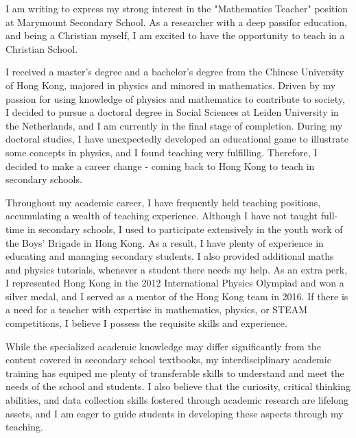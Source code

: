 \documentclass[11pt, a4paper]{awesome-cv}
\begin{document}
\makecvheader[R]

\makecvfooter
  {}%
  {}%
  {}

\makelettertitle

\begin{cvletter}

I am writing to express my strong interest in the "Mathematics Teacher" position at Marymount Secondary School. As a researcher with a deep passifor education, and being a Christian myself, I am excited to have the opportunity to teach in a Christian School.

I received a master's degree and a bachelor's degree from the Chinese University of Hong Kong, majored in physics and minored in mathematics. Driven by my passion for using knowledge of physics and mathematics to contribute to society, I decided to pursue a doctoral degree in Social Sciences at Leiden University in the Netherlands, and I am currently in the final stage of completion. During my doctoral studies, I have unexpectedly developed an educational game to illustrate some concepts in physics, and I found teaching very fulfilling. Therefore, I decided to make a career change - coming back to Hong Kong to teach in secondary schools.

Throughout my academic career, I have frequently held teaching positions, accumulating a wealth of teaching experience. Although I have not taught full-time in secondary schools, I used to participate extensively in the youth work of the Boys' Brigade in Hong Kong. As a result, I have plenty of experience in educating and managing secondary students. I also provided additional maths and physics tutorials, whenever a student there needs my help. As an extra perk, I represented Hong Kong in the 2012 International Physics Olympiad and won a silver medal, and I served as a mentor of the Hong Kong team in 2016. If there is a need for a teacher with expertise in mathematics, physics, or STEAM competitions, I believe I possess the requisite skills and experience.

While the specialized academic knowledge may differ significantly from the content covered in secondary school textbooks, my interdisciplinary academic training has equiped me plenty of transferable skills to understand and meet the needs of the school and students. I also believe that the curiosity, critical thinking abilities, and data collection skills fostered through academic research are lifelong assets, and I am eager to guide students in developing these aspects through my teaching.


\end{cvletter}
\end{document}
